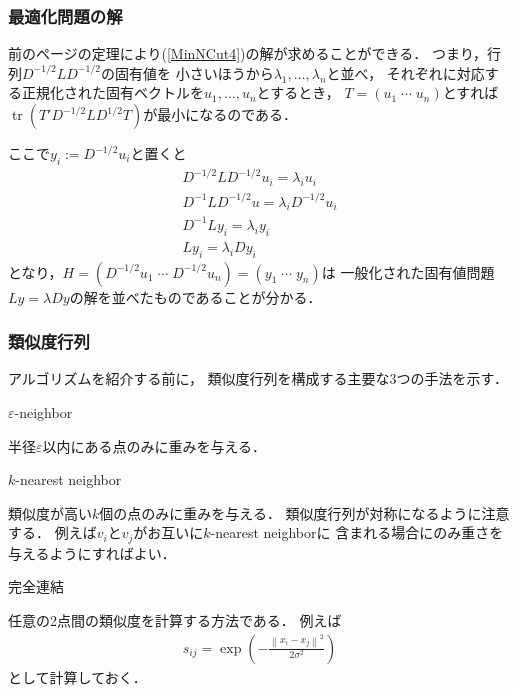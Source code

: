 \documentclass[10pt,hyperref={unicode}]{beamer}
\DeclareMathOperator*{\tr}{tr}
\newenvironment{wideenumerate}{\enumerate\addtolength{\itemsep}{1em}}{\endenumerate}
\newcommand{\pref}[1]{{\fontfamily{cmr}\selectfont (\ref{#1})}}
\newcommand{\parentheses}[1]{\left(#1\right)}
\newcommand{\norm}[1]{\left\|#1\right\|}
\begin{document}
\begin{frame}
\frametitle{最適化問題の解}
前のページの定理により\pref{MinNCut4}の解が求めることができる．
つまり，行列$D^{-1/2}LD^{-1/2}$の固有値を
小さいほうから$\lambda_1,\ldots,\lambda_n$と並べ，
それぞれに対応する正規化された固有ベクトルを$u_1,\ldots,u_n$とするとき，
$T = \parentheses{u_1 \; \cdots \; u_n}$とすれば
$\tr\parentheses{T'D^{-1/2}LD^{1/2}T}$が最小になるのである．

\bigskip

ここで$y_i := D^{-1/2}u_i$と置くと
\begin{gather*}
    D^{-1/2}LD^{-1/2}u_i = \lambda_i u_i \\
    D^{-1}LD^{-1/2}u = \lambda_i D^{-1/2}u_i \\
    D^{-1}Ly_i = \lambda_i y_i \\
    Ly_i = \lambda_i D y_i
\end{gather*}
となり，$H = \parentheses{D^{-1/2}u_1 \; \cdots \; D^{-1/2}u_n} = \parentheses{y_1 \; \cdots \; y_n}$は
一般化された固有値問題$L y = \lambda D y$の解を並べたものであることが分かる．
\end{frame}

\begin{frame}
\frametitle{類似度行列}
アルゴリズムを紹介する前に，
類似度行列を構成する主要な3つの手法を示す．

\bigskip

\begin{wideenumerate}
    \item $\varepsilon$-neighbor

        半径$\varepsilon$以内にある点のみに重みを与える．

    \item $k$-nearest neighbor

        類似度が高い$k$個の点のみに重みを与える．
        類似度行列が対称になるように注意する．
        例えば$v_i$と$v_j$がお互いに$k$-nearest neighborに
        含まれる場合にのみ重さを与えるようにすればよい．

    \item 完全連結

        任意の2点間の類似度を計算する方法である．
        例えば
        \begin{align*}
            s_{ij} = \exp\parentheses{- \frac{\norm{x_i - x_j}^2 }{2\sigma^2}}
        \end{align*}
        として計算しておく．
\end{wideenumerate}
\end{frame}
\end{document}
